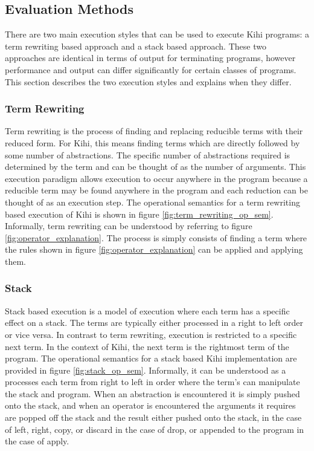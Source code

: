 




\subsection{Evaluation Methods}\label{sec:background_evaluation_methods}
There are two main execution styles that can be used to execute Kihi programs: a term rewriting based approach and a stack based approach. These two approaches are identical in terms of output for terminating programs, however performance and output can differ significantly for certain classes of programs. This section describes the two execution styles and explains when they differ.

\subsubsection{Term Rewriting}
Term rewriting is the process of finding
and replacing reducible terms with their reduced form. For Kihi,
this means finding terms which are directly followed by
some number of abstractions. The specific number of abstractions
required is determined by the term and can be thought of as the
number of arguments. This execution paradigm allows execution
to occur anywhere in the program because a reducible term may
be found anywhere in the program and each reduction can be
thought of as an execution step. The operational semantics for a term rewriting based execution of
Kihi is shown in figure \ref{fig:term_rewriting_op_sem}. Informally, term rewriting can be understood by referring to figure \ref{fig:operator_explanation}. The process is simply consists of finding a term where the rules shown in figure \ref{fig:operator_explanation} can be applied and applying them.

\subsubsection{Stack}
Stack based execution is a model of execution where each term has a specific effect on a stack. The terms are typically either processed in a right to left order or vice versa. In contrast to term rewriting, execution is restricted to a specific next term. In the context of Kihi, the next term is the rightmost term of the program. The operational semantics for a stack based Kihi implementation are provided in figure \ref{fig:stack_op_sem}. Informally, it can be understood as a processes each term from right to left in order where the term's can manipulate the stack and program. When an abstraction is encountered it is simply pushed onto the stack, and when an operator is encountered the arguments it requires are popped off the stack and the result either pushed onto the stack, in the case of left, right, copy, or discard in the case of drop, or appended to the program in the case of apply.

